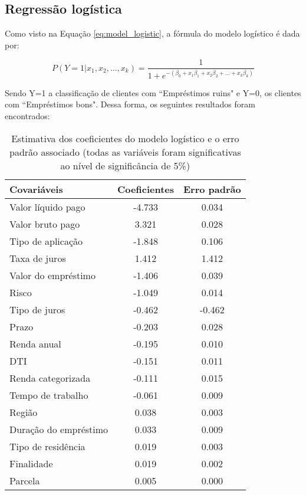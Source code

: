 \subsection{Regressão logística}

Como visto na Equação \ref{eq:model_logistic}, a fórmula do modelo logístico é dada por:

\begin{equation}
  P(Y=1| x_1, x_2, ..., x_k) = \frac{1}{1 + e^{-(\beta_0 + x_{1}\beta_1 + x_{2}\beta_2 + \ldots + x_{k}\beta_k)}}
\end{equation}

Sendo Y=1 a classificação de clientes com ``Empréstimos ruins" e Y=0, os clientes com ``Empréstimos bons". 
Dessa forma, os seguintes resultados foram encontrados:


\begin{table}[H]
\centering
\begin{tabular}{lcc}
  \toprule
    \textbf{Covariáveis} & \textbf{Coeficientes} &  \textbf{Erro padrão} \\
  \midrule
        Valor líquido pago & -4.733 &  0.034 \\
        Valor bruto pago &  3.321 &  0.028 \\
        Tipo de aplicação & -1.848 &  0.106 \\
        Taxa de juros &  1.412 &  1.412 \\
        Valor do empréstimo & -1.406 &  0.039 \\
        Risco & -1.049 &  0.014 \\
        Tipo de juros & -0.462 &  -0.462  \\
        Prazo & -0.203 &  0.028 \\
        Renda anual & -0.195 &  0.010 \\
        DTI & -0.151 &  0.011 \\
        Renda categorizada & -0.111 &  0.015 \\
        Tempo de trabalho & -0.061 &  0.009 \\
        Região &  0.038 &  0.003\\
        Duração do empréstimo &  0.033 &  0.009 \\
        Tipo de residência &  0.019 &  0.003 \\
        Finalidade &  0.019 &  0.002  \\
        Parcela &  0.005 &  0.000  \\
  \bottomrule
\end{tabular}
\caption{Estimativa dos coeficientes do modelo logístico e o erro padrão associado (todas as variáveis foram significativas ao nível de significância de 5\%)}
\label{tab:result_model_logist}
\end{table}

